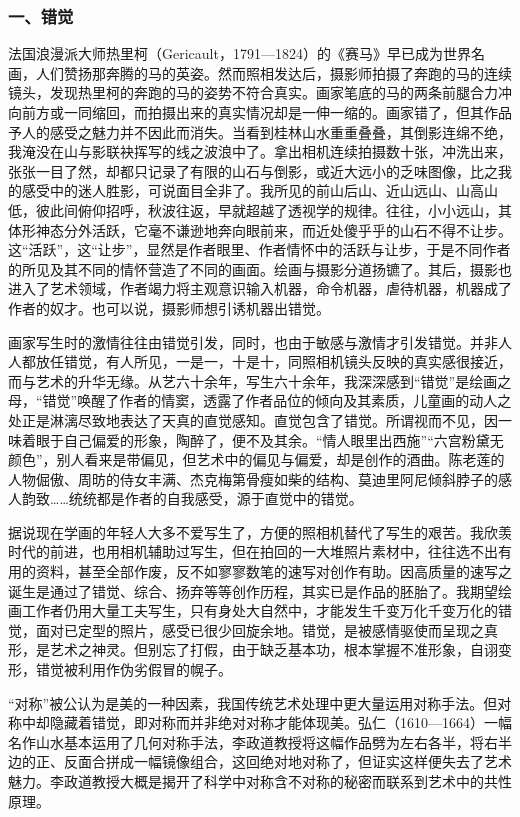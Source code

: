\documentclass{article}
\begin{document}
\subsubsection{一、错觉}
法国浪漫派大师热里柯（Gericault，1791—1824）的《赛马》早已成为世界名画，人们赞扬那奔腾的马的英姿。然而照相发达后，摄影师拍摄了奔跑的马的连续镜头，发现热里柯的奔跑的马的姿势不符合真实。画家笔底的马的两条前腿合力冲向前方或一同缩回，而拍摄出来的真实情况却是一伸一缩的。画家错了，但其作品予人的感受之魅力并不因此而消失。当看到桂林山水重重叠叠，其倒影连绵不绝，我淹没在山与影联袂挥写的线之波浪中了。拿出相机连续拍摄数十张，冲洗出来，张张一目了然，却都只记录了有限的山石与倒影，或近大远小的乏味图像，比之我的感受中的迷人胜影，可说面目全非了。我所见的前山后山、近山远山、山高山低，彼此间俯仰招呼，秋波往返，早就超越了透视学的规律。往往，小小远山，其体形神态分外活跃，它毫不谦逊地奔向眼前来，而近处傻乎乎的山石不得不让步。这“活跃”，这“让步”，显然是作者眼里、作者情怀中的活跃与让步，于是不同作者的所见及其不同的情怀营造了不同的画面。绘画与摄影分道扬镳了。其后，摄影也进入了艺术领域，作者竭力将主观意识输入机器，命令机器，虐待机器，机器成了作者的奴才。也可以说，摄影师想引诱机器出错觉。

画家写生时的激情往往由错觉引发，同时，也由于敏感与激情才引发错觉。并非人人都放任错觉，有人所见，一是一，十是十，同照相机镜头反映的真实感很接近，而与艺术的升华无缘。从艺六十余年，写生六十余年，我深深感到“错觉”是绘画之母，“错觉”唤醒了作者的情窦，透露了作者品位的倾向及其素质，儿童画的动人之处正是淋漓尽致地表达了天真的直觉感知。直觉包含了错觉。所谓视而不见，因一味着眼于自己偏爱的形象，陶醉了，便不及其余。“情人眼里出西施”“六宫粉黛无颜色”，别人看来是带偏见，但艺术中的偏见与偏爱，却是创作的酒曲。陈老莲的人物倔傲、周昉的侍女丰满、杰克梅第骨瘦如柴的结构、莫迪里阿尼倾斜脖子的感人韵致……统统都是作者的自我感受，源于直觉中的错觉。

据说现在学画的年轻人大多不爱写生了，方便的照相机替代了写生的艰苦。我欣羡时代的前进，也用相机辅助过写生，但在拍回的一大堆照片素材中，往往选不出有用的资料，甚至全部作废，反不如寥寥数笔的速写对创作有助。因高质量的速写之诞生是通过了错觉、综合、扬弃等等创作历程，其实已是作品的胚胎了。我期望绘画工作者仍用大量工夫写生，只有身处大自然中，才能发生千变万化千变万化的错觉，面对已定型的照片，感受已很少回旋余地。错觉，是被感情驱使而呈现之真形，是艺术之神灵。但别忘了打假，由于缺乏基本功，根本掌握不准形象，自诩变形，错觉被利用作伪劣假冒的幌子。

“对称”被公认为是美的一种因素，我国传统艺术处理中更大量运用对称手法。但对称中却隐藏着错觉，即对称而并非绝对对称才能体现美。弘仁（1610—1664）一幅名作山水基本运用了几何对称手法，李政道教授将这幅作品劈为左右各半，将右半边的正、反面合拼成一幅镜像组合，这回绝对地对称了，但证实这样便失去了艺术魅力。李政道教授大概是揭开了科学中对称含不对称的秘密而联系到艺术中的共性原理。
\end{document}
